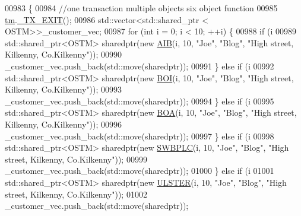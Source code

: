 \begin{DoxyCode}
00983                                                      \{
00984     \textcolor{comment}{//one transaction multiple objects six object function}
00985     \hyperlink{class_my_test_c_ase_a422e6e5d4ddedea384be96031c89b72b_a422e6e5d4ddedea384be96031c89b72b}{tm}.\hyperlink{class_t_m_a5e2d1127f2429f2f524d25f430eade06_a5e2d1127f2429f2f524d25f430eade06}{\_TX\_EXIT}();
00986     std::vector<std::shared\_ptr < OSTM>>\_customer\_vec; 
00987      \textcolor{keywordflow}{for} (\textcolor{keywordtype}{int} i = 0; i < 10; ++i) \{
00988         \textcolor{keywordflow}{if} (i %
00989             std::shared\_ptr<OSTM> sharedptr(\textcolor{keyword}{new} \hyperlink{class_a_i_b}{AIB}(i, 10, \textcolor{stringliteral}{"Joe"}, \textcolor{stringliteral}{"Blog"}, \textcolor{stringliteral}{"High street, Kilkenny,
       Co.Kilkenny"}));
00990             \_customer\_vec.push\_back(std::move(sharedptr));
00991         \} \textcolor{keywordflow}{else} \textcolor{keywordflow}{if} (i %
00992             std::shared\_ptr<OSTM> sharedptr(\textcolor{keyword}{new} \hyperlink{class_b_o_i}{BOI}(i, 10, \textcolor{stringliteral}{"Joe"}, \textcolor{stringliteral}{"Blog"}, \textcolor{stringliteral}{"High street, Kilkenny,
       Co.Kilkenny"}));
00993             \_customer\_vec.push\_back(std::move(sharedptr));
00994         \} \textcolor{keywordflow}{else} \textcolor{keywordflow}{if} (i %
00995             std::shared\_ptr<OSTM> sharedptr(\textcolor{keyword}{new} \hyperlink{class_b_o_a}{BOA}(i, 10, \textcolor{stringliteral}{"Joe"}, \textcolor{stringliteral}{"Blog"}, \textcolor{stringliteral}{"High street, Kilkenny,
       Co.Kilkenny"}));
00996             \_customer\_vec.push\_back(std::move(sharedptr));
00997         \} \textcolor{keywordflow}{else} \textcolor{keywordflow}{if} (i %
00998             std::shared\_ptr<OSTM> sharedptr(\textcolor{keyword}{new} \hyperlink{class_s_w_b_p_l_c}{SWBPLC}(i, 10, \textcolor{stringliteral}{"Joe"}, \textcolor{stringliteral}{"Blog"}, \textcolor{stringliteral}{"High street, Kilkenny,
       Co.Kilkenny"}));
00999             \_customer\_vec.push\_back(std::move(sharedptr));
01000         \} \textcolor{keywordflow}{else} \textcolor{keywordflow}{if} (i %
01001             std::shared\_ptr<OSTM> sharedptr(\textcolor{keyword}{new} \hyperlink{class_u_l_s_t_e_r}{ULSTER}(i, 10, \textcolor{stringliteral}{"Joe"}, \textcolor{stringliteral}{"Blog"}, \textcolor{stringliteral}{"High street, Kilkenny,
       Co.Kilkenny"}));
01002             \_customer\_vec.push\_back(std::move(sharedptr));

\end{DoxyCode}

